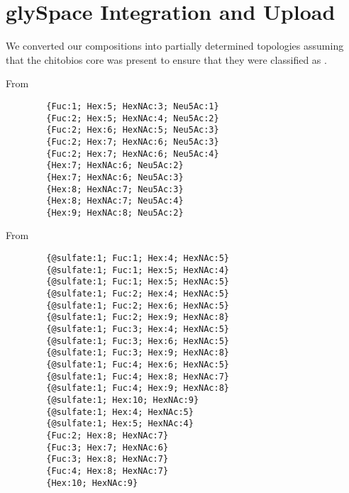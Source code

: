\section{glySpace Integration and Upload}\label{sec:glyspace_integration_and_upload}

    We converted our \nglycan compositions into partially determined topologies
    assuming that the chitobios core was present to ensure that they were classified
    as \nglycans.

    From \rpserum
    \begin{verbatim}
        {Fuc:1; Hex:5; HexNAc:3; Neu5Ac:1}
        {Fuc:2; Hex:5; HexNAc:4; Neu5Ac:2}
        {Fuc:2; Hex:6; HexNAc:5; Neu5Ac:3}
        {Fuc:2; Hex:7; HexNAc:6; Neu5Ac:3}
        {Fuc:2; Hex:7; HexNAc:6; Neu5Ac:4}
        {Hex:7; HexNAc:6; Neu5Ac:2}
        {Hex:7; HexNAc:6; Neu5Ac:3}
        {Hex:8; HexNAc:7; Neu5Ac:3}
        {Hex:8; HexNAc:7; Neu5Ac:4}
        {Hex:9; HexNAc:8; Neu5Ac:2}
    \end{verbatim}

    From \philbs
    \begin{verbatim}
        {@sulfate:1; Fuc:1; Hex:4; HexNAc:5}
        {@sulfate:1; Fuc:1; Hex:5; HexNAc:4}
        {@sulfate:1; Fuc:1; Hex:5; HexNAc:5}
        {@sulfate:1; Fuc:2; Hex:4; HexNAc:5}
        {@sulfate:1; Fuc:2; Hex:6; HexNAc:5}
        {@sulfate:1; Fuc:2; Hex:9; HexNAc:8}
        {@sulfate:1; Fuc:3; Hex:4; HexNAc:5}
        {@sulfate:1; Fuc:3; Hex:6; HexNAc:5}
        {@sulfate:1; Fuc:3; Hex:9; HexNAc:8}
        {@sulfate:1; Fuc:4; Hex:6; HexNAc:5}
        {@sulfate:1; Fuc:4; Hex:8; HexNAc:7}
        {@sulfate:1; Fuc:4; Hex:9; HexNAc:8}
        {@sulfate:1; Hex:10; HexNAc:9}
        {@sulfate:1; Hex:4; HexNAc:5}
        {@sulfate:1; Hex:5; HexNAc:4}
        {Fuc:2; Hex:8; HexNAc:7}
        {Fuc:3; Hex:7; HexNAc:6}
        {Fuc:3; Hex:8; HexNAc:7}
        {Fuc:4; Hex:8; HexNAc:7}
        {Hex:10; HexNAc:9}
    \end{verbatim}